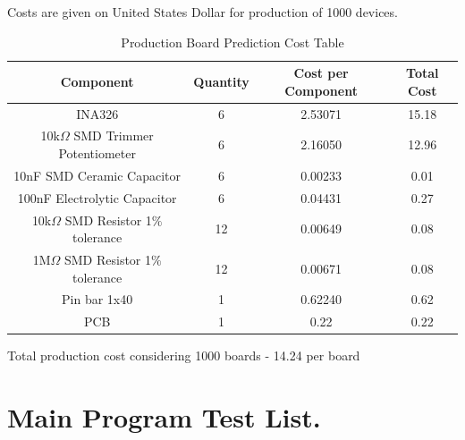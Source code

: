 Costs are given on United States Dollar for production of 1000 devices.\\
\begin{table}[htb]
  \begin{center}
    \ABNTEXreducedfont
    \caption[Production Board Prediction Cost Table]{Production Board Prediction Cost Table}
    \label{Production-cost}
    \begin{tabular}{c|c|c|c}
      \textbf{Component} & \textbf{Quantity} & \textbf{Cost per Component} & \textbf{Total Cost} \\
     \hline
     \hline
    INA326 & 6 & 2.53071 & 15.18\\ \hline
    10k$\Omega$ SMD Trimmer Potentiometer & 6 & 2.16050 & 12.96 \\ \hline
    10nF SMD Ceramic Capacitor & 6 & 0.00233 & 0.01 \\ \hline
    100nF Electrolytic Capacitor & 6 & 0.04431 & 0.27 \\ \hline
    10k$\Omega$ SMD Resistor 1$\%$ tolerance & 12 & 0.00649 & 0.08 \\ \hline
    1M$\Omega$ SMD Resistor 1$\%$ tolerance & 12 & 0.00671 & 0.08 \\ \hline
    Pin bar 1x40 & 1 & 0.62240 & 0.62 \\ \hline
    PCB & 1 & 0.22 & 0.22 \\ \hline
  \end{tabular}
\end{center}
\end{table}

Total production cost considering 1000 boards - 14.24 per board

\chapter{Main Program Test List.}
\label{test-list}

